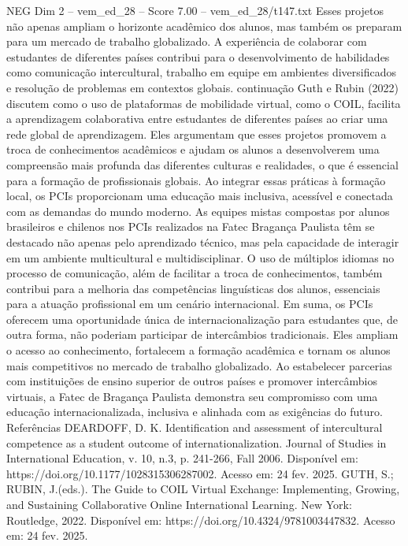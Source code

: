 \begin{textsample}{NEG Dim 2 – vem\_ed\_28 – Score 7.00 – vem\_ed\_28/t147.txt}
Esses projetos não apenas ampliam o horizonte acadêmico dos alunos, mas também os preparam para um mercado de trabalho globalizado.
A experiência de colaborar com estudantes de diferentes países contribui para o desenvolvimento de habilidades como comunicação intercultural, trabalho em equipe em ambientes diversificados e resolução de problemas em contextos globais. continuação Guth e Rubin (2022) discutem como o uso de plataformas de mobilidade virtual, como o COIL, facilita a aprendizagem colaborativa entre estudantes de diferentes países ao criar uma rede global de aprendizagem.
Eles argumentam que esses projetos promovem a troca de conhecimentos acadêmicos e ajudam os alunos a desenvolverem uma compreensão mais profunda das diferentes culturas e realidades, o que é essencial para a formação de profissionais globais.
Ao integrar essas práticas à formação local, os PCIs proporcionam uma educação mais inclusiva, acessível e conectada com as demandas do mundo moderno.
As equipes mistas compostas por alunos brasileiros e chilenos nos PCIs realizados na Fatec Bragança Paulista têm se destacado não apenas pelo aprendizado técnico, mas pela capacidade de interagir em um ambiente multicultural e multidisciplinar.
O uso de múltiplos idiomas no processo de comunicação, além de facilitar a troca de conhecimentos, também contribui para a melhoria das competências linguísticas dos alunos, essenciais para a atuação profissional em um cenário internacional.
Em suma, os PCIs oferecem uma oportunidade única de internacionalização para estudantes que, de outra forma, não poderiam participar de intercâmbios tradicionais.
Eles ampliam o acesso ao conhecimento, fortalecem a formação acadêmica e tornam os alunos mais competitivos no mercado de trabalho globalizado.
Ao estabelecer parcerias com instituições de ensino superior de outros países e promover intercâmbios virtuais, a Fatec de Bragança Paulista demonstra seu compromisso com uma educação internacionalizada, inclusiva e alinhada com as exigências do futuro.
Referências DEARDOFF, D.
K.
Identification and assessment of intercultural competence as a student outcome of internationalization.
Journal of Studies in International Education, v. 10, n.3, p. 241-266, Fall 2006.
Disponível em: https://doi.org/10.1177/1028315306287002.
Acesso em: 24 fev. 2025.
GUTH, S.; RUBIN, J.(eds.).
The Guide to COIL Virtual Exchange: Implementing, Growing, and Sustaining Collaborative Online International Learning.
New York: Routledge, 2022.
Disponível em: https://doi.org/10.4324/9781003447832.
Acesso em: 24 fev. 2025.

\end{textsample}
